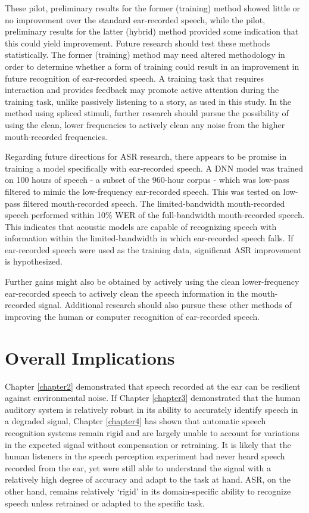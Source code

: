 These pilot, preliminary results for the former (training) method showed little or no improvement over the standard ear-recorded speech, while the pilot, preliminary results for the latter (hybrid) method provided some indication that this could yield improvement.  Future research should test these methods statistically.  The former (training) method may need altered methodology in order to determine whether a form of training could result in an improvement in future recognition of ear-recorded speech.  A training task that requires interaction and provides feedback may promote active attention during the training task, unlike passively listening to a story, as used in this study.  In the method using spliced stimuli, further research should pursue the possibility of using the clean, lower frequencies to actively clean any noise from the higher mouth-recorded frequencies.  

Regarding future directions for ASR research, there appears to be promise in training a model specifically with ear-recorded speech. A DNN model was trained on 100 hours of speech - a subset of the 960-hour corpus - which was low-pass filtered to mimic the low-frequency ear-recorded speech.  This was tested on low-pass filtered mouth-recorded speech.  The limited-bandwidth mouth-recorded speech performed within 10\% WER of the full-bandwidth mouth-recorded speech.  This indicates that acoustic models are capable of recognizing speech with information within the limited-bandwidth in which ear-recorded speech falls.  If ear-recorded speech were used as the training data, significant ASR improvement is hypothesized.

Further gains might also be obtained by actively using the clean lower-frequency ear-recorded speech to actively clean the speech information in the mouth-recorded signal.
Additional research should also pursue these other methods of improving the human or computer recognition of ear-recorded speech. 


\section{Overall Implications}\label{chap5:implications}

Chapter \ref{chapter2} demonstrated that speech recorded at the ear can be resilient against environmental noise.  If Chapter \ref{chapter3} demonstrated that the human auditory system is relatively robust in its ability to accurately identify speech in a degraded signal, Chapter \ref{chapter4} has shown that automatic speech recognition systems remain rigid and are largely unable to account for variations in the expected signal without compensation or retraining.  It is likely that the human listeners in the speech perception experiment had never heard speech recorded from the ear, yet were still able to understand the signal with a relatively high degree of accuracy and adapt to the task at hand.  ASR, on the other hand, remains relatively `rigid' in its domain-specific ability to recognize speech unless retrained or adapted to the specific task.

